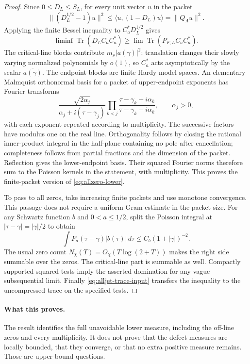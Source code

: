 \begin{proof}
Since $0\leq D_L\leq S_L$, for every unit vector $u$ in the packet
\[
 \|(D_L^{1/2}-1)u\|^2
      \leq\langle u,(1-D_L)u\rangle=\|Q_\Lambda u\|^2.
\]
Applying the finite Bessel inequality to
$C_a^*D_L^{1/2}$ gives
\[
 \liminf\operatorname{Tr}(D_LC_aC_a^*)
 \geq\lim\operatorname{Tr}(P_{F,L}C_aC_a^*).
\]
The critical-line blocks contribute $m_\rho|a(\gamma)|^2$:
translation changes their slowly varying normalized polynomials by
$o(1)$, so $C_a^*$ acts asymptotically by the scalar
$\overline{a(\gamma)}$.
The endpoint blocks are finite Hardy model spaces.  An elementary
Malmquist orthonormal basis for a packet of upper-endpoint exponents
has Fourier transforms
\[
 \frac{\sqrt{2\alpha_j}}{\alpha_j+i(\tau-\gamma_j)}
 \prod_{k<j}\frac{\tau-\gamma_k+i\alpha_k}
                     {\tau-\gamma_k-i\alpha_k},
 \qquad\alpha_j>0,
\]
with each exponent repeated according to multiplicity.
The successive factors have modulus one on the real line.
Orthogonality follows by closing the rational inner-product integral
in the half-plane containing no pole after cancellation; completeness
follows from partial fractions and the dimension of the packet.
Reflection gives the lower-endpoint basis.
Their squared Fourier norms therefore sum to the Poisson kernels
in the statement, with multiplicity.  This proves the finite-packet
version of \eqref{eq:allzero-lower}.

To pass to all zeros, take increasing finite packets and use monotone
convergence.  This passage does not require a uniform Gram estimate
in the packet size.  For any Schwartz function $b$ and $0<a\leq1/2$,
split the Poisson integral at $|\tau-\gamma|=|\gamma|/2$ to obtain
\[
 \int P_a(\tau-\gamma)|b(\tau)|\,d\tau
                         \leq C_b(1+|\gamma|)^{-2}.
\]
The usual zero count $N_\chi(T)=O_\chi(T\log(2+T))$ makes the
right side summable over the zeros.  The critical-line part is
summable as well.  Compactly supported squared tests imply the
asserted domination for any vague subsequential limit.
Finally \eqref{eq:alljet-trace-input} transfers the inequality to
the uncompressed trace on the specified tests.
\end{proof}

\paragraph{What this proves.}
The result identifies the full unavoidable lower measure, including
the off-line zeros and every multiplicity.  It does not prove that
the defect measures are locally bounded, that they converge, or
that no extra positive measure remains.  Those are upper-bound
questions.
